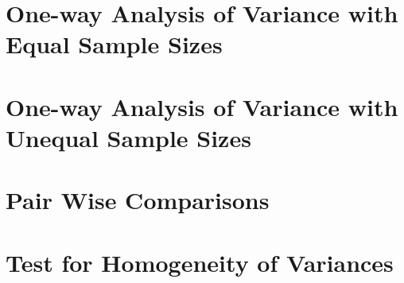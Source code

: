 \section{One-way Analysis of Variance with Equal Sample Sizes}

\section{One-way Analysis of Variance with Unequal Sample Sizes}

\section{Pair Wise Comparisons}

\section{Test for Homogeneity of Variances}

